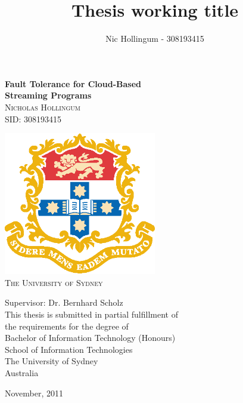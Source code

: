 \documentclass{report}
\author{Nic Hollingum - 308193415}
\title{Thesis working title}
\begin{document}
\addtolength{\headheight}{2.5pt}
\onehalfspace
\pagestyle{fancy}

\newcommand{\HRule}{\rule{\linewidth}{0.5mm}}
\begin{titlepage}
\begin{center}

	{\huge \bfseries Fault Tolerance for Cloud-Based}
	\\[0.3cm]
	{\huge \bfseries Streaming Programs}
	\\[0.6cm]
	
	\textsc{\LARGE 	Nicholas Hollingum	\\
					SID: 308193415		\\[0.6cm]}
	
	\includegraphics[width=0.50\textwidth]{figures/usyd.eps}\\[0.2cm]
  
  \textsc{\LARGE The University of Sydney}\\[0.8cm]
  
  
  \begin{center}
  \large Supervisor: Dr. Bernhard Scholz\\[0.4cm]

  This thesis is submitted in partial fulfillment of\\
  the requirements for the degree of\\
  Bachelor of Information Technology (Honours)\\[0.5cm]

  \Large School of Information Technologies\\
  The University of Sydney\\
  Australia
  \end{center}
  \vfill
  {\large November, 2011}
\end{center}
\end{titlepage}
\newpage
\newpage




\tableofcontents















\end{document}
